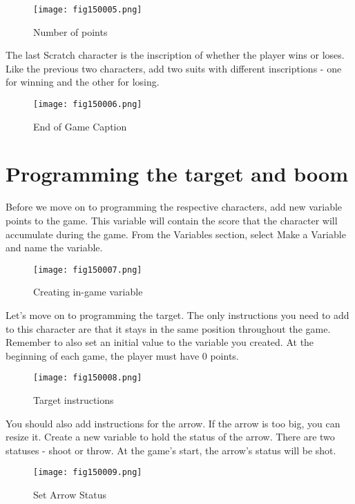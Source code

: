 \begin{figure}[H]
   \centering
   \texttt{[image: fig150005.png]}
   \caption{Number of points}
\label{fig150005}
\end{figure}

The last Scratch character is the inscription of whether the player wins or loses. Like the previous two characters, add two suits with different inscriptions - one for winning and the other for losing.

\begin{figure}[H]
   \centering
   \texttt{[image: fig150006.png]}
   \caption{End of Game Caption}
\label{fig150006}
\end{figure}

\section{Programming the target and boom}
Before we move on to programming the respective characters, add new variable points to the game. This variable will contain the score that the character will accumulate during the game. From the Variables section, select Make a Variable and name the variable.

\begin{figure}[H]
   \centering
   \texttt{[image: fig150007.png]}
   \caption{Creating in-game variable}
\label{fig150007}
\end{figure}

Let's move on to programming the target. The only instructions you need to add to this character are that it stays in the same position throughout the game. Remember to also set an initial value to the variable you created. At the beginning of each game, the player must have 0 points.

\begin{figure}[H]
   \centering
   \texttt{[image: fig150008.png]}
   \caption{Target instructions}
\label{fig150008}
\end{figure}

You should also add instructions for the arrow. If the arrow is too big, you can resize it. Create a new variable to hold the status of the arrow. There are two statuses - shoot or throw. At the game's start, the arrow's status will be shot.

\begin{figure}[H]
   \centering
   \texttt{[image: fig150009.png]}
   \caption{Set Arrow Status}
\label{fig150009}
\end{figure}

